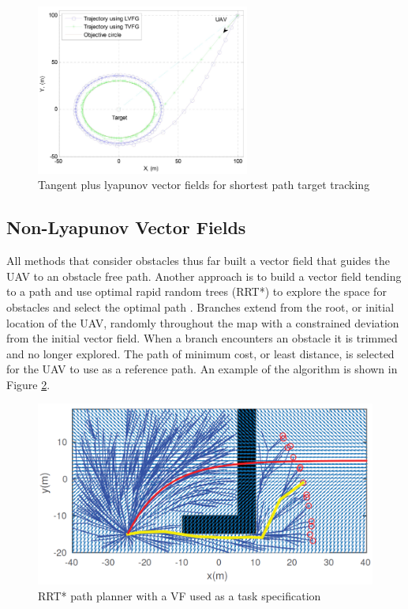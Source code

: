 \documentclass[numbered,pdftex]{ohio-etd}
\begin{document}
\begin{figure}
	\centering
	\includegraphics[width=7cm]{PaperFigures/lyapunovChen}
	\caption{Tangent plus lyapunov vector fields for shortest path target tracking \cite{chen_uav_2013}}
	\label{fig:lyapunovChen}
\end{figure}


\subsection{Non-Lyapunov Vector Fields}
All methods that consider obstacles thus far built a vector field that guides the UAV to an obstacle free path. Another approach is to build a vector field tending to a path and use optimal rapid random trees (RRT*) to explore the space for obstacles and select the optimal path \cite{pereira_framework_2016}. Branches extend from the root, or initial location of the UAV, randomly throughout the map with a constrained deviation from the initial vector field. When a branch encounters an obstacle it is trimmed and no longer explored. The path of minimum cost, or least distance, is selected for the UAV to use as a reference path. An example of the algorithm is shown in Figure \ref{fig:rrtvf}.

\begin{figure}
	\centering
	\includegraphics[width=12cm]{PaperFigures/rrtVF}
	\caption{RRT* path planner with a VF used as a task specification \cite{pereira_framework_2016}}
	\label{fig:rrtvf}
\end{figure}
\end{document}
